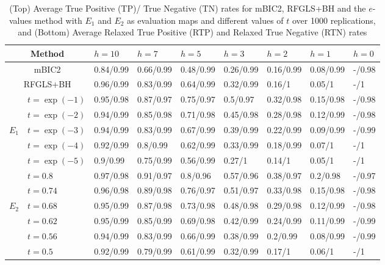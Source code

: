 \begin{sidewaystable}
\begin{scriptsize}
\vspace{1em}

        \begin{tabular}{c|l|lllllll}
    \hline
    \multicolumn{2}{c|}{Method}          & $h = 10$    & $h = 7$     & $h = 5$     & $h = 3$     & $h = 2$     & $h = 1$     & $h = 0$     \\ \hline
    \multicolumn{2}{c|}{mBIC2}           & 0.84/0.99 & 0.66/0.99 & 0.48/0.99 & 0.26/0.99 & 0.16/0.99 & 0.08/0.99 & -/0.98 \\
    \multicolumn{2}{c|}{RFGLS+BH}        & 0.96/0.99 & 0.83/0.99 & 0.64/0.99 & 0.32/0.99 & 0.16/1    & 0.05/1    & -/1    \\ \hline
    ~        & $t = \exp(-1)$ & 0.95/0.98 & 0.87/0.97 & 0.75/0.97 & 0.5/0.97  & 0.32/0.98 & 0.15/0.98 & -/0.98 \\
    ~        & $t = \exp(-2)$ & 0.94/0.99 & 0.85/0.98 & 0.71/0.98 & 0.45/0.98 & 0.28/0.98 & 0.12/0.99 & -/0.98 \\
    $E_1$    & $t = \exp(-3)$ & 0.94/0.99 & 0.83/0.99 & 0.67/0.99 & 0.39/0.99 & 0.22/0.99 & 0.09/0.99 & -/0.99    \\
    ~        & $t = \exp(-4)$ & 0.92/0.99 & 0.8/0.99  & 0.62/0.99 & 0.33/0.99 & 0.18/0.99 & 0.07/1    & -/1    \\
    ~        & $t = \exp(-5)$ & 0.9/0.99  & 0.75/0.99 & 0.56/0.99 & 0.27/1    & 0.14/1    & 0.05/1    & -/1    \\ \hline
    ~        & $t = 0.8$    & 0.97/0.98 & 0.91/0.97 & 0.8/0.96  & 0.57/0.96 & 0.38/0.97 & 0.2/0.98  & -/0.97 \\
    ~        & $t = 0.74$   & 0.96/0.98 & 0.89/0.98 & 0.76/0.97 & 0.51/0.97 & 0.33/0.98 & 0.15/0.98 & -/0.98 \\
    $E_2$    & $t = 0.68$   & 0.95/0.99 & 0.87/0.98 & 0.73/0.98 & 0.48/0.98 & 0.29/0.98 & 0.12/0.99 & -/0.98 \\
    ~        & $t = 0.62$   & 0.95/0.99 & 0.85/0.99 & 0.69/0.98 & 0.42/0.99 & 0.24/0.99 & 0.11/0.99 & -/0.99    \\
    ~        & $t = 0.56$   & 0.94/0.99 & 0.83/0.99 & 0.66/0.99 & 0.38/0.99 & 0.2/0.99  & 0.08/0.99 & -/0.99    \\
    ~        & $t = 0.5$    & 0.92/0.99 & 0.79/0.99 & 0.61/0.99 & 0.32/0.99 & 0.17/1    & 0.06/1    & -/1    \\ \hline
    \end{tabular}
\end{scriptsize}
\caption{(Top) Average True Positive (TP)/ True Negative (TN) rates for mBIC2, RFGLS+BH and the $e$-values method with $E_1$ and $E_2$ as evaluation maps and different values of $t$ over 1000 replications, and (Bottom) Average Relaxed True Positive (RTP) and Relaxed True Negative (RTN) rates}
\label{table:SNPSimTable0}
\end{sidewaystable}
%

